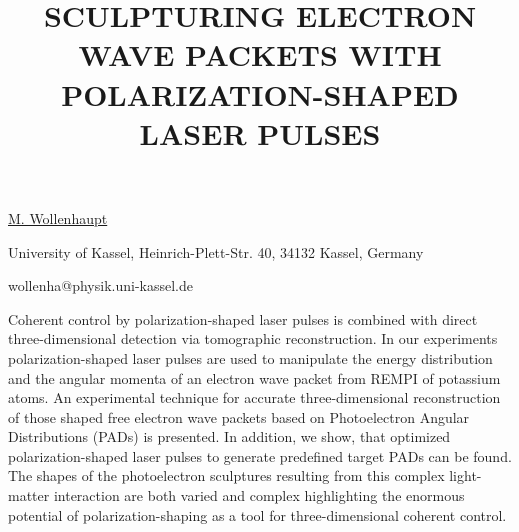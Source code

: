 \title{SCULPTURING ELECTRON WAVE PACKETS WITH POLARIZATION-SHAPED LASER PULSES}

\underline{M. Wollenhaupt} 

{\normalsize{\vspace{-4mm}
University of Kassel, Heinrich-Plett-Str. 40, 34132 Kassel, Germany

\email wollenha@physik.uni-kassel.de}}

Coherent control by polarization-shaped laser pulses is combined with direct three-dimensional detection via tomographic reconstruction.  In our experiments polarization-shaped laser pulses are used to manipulate the energy distribution and the angular momenta of an electron wave packet from REMPI of potassium atoms.  An experimental technique for accurate three-dimensional reconstruction of those shaped free electron wave packets based on Photoelectron Angular Distributions (PADs) is presented.  In addition, we show, that optimized polarization-shaped laser pulses to generate predefined target PADs can be found. The shapes of the photoelectron sculptures resulting from this complex light-matter interaction are both varied and complex highlighting the enormous potential of polarization-shaping as a tool for three-dimensional coherent control.

\vspace{\baselineskip}